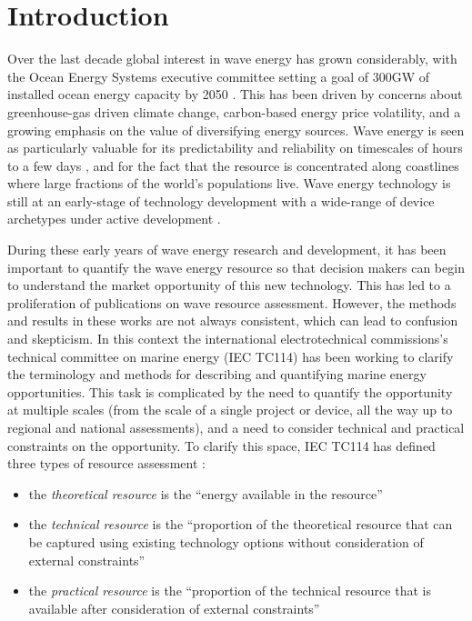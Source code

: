 \section{Introduction}

Over the last decade global interest in wave energy has grown considerably, with
the Ocean Energy Systems executive committee setting a goal of 300GW of
installed ocean energy capacity by 2050
\citep[]{huckerbyInternationalVisionOcean2017}. This has been driven by concerns
about greenhouse-gas driven climate change, carbon-based energy price
volatility, and a growing emphasis on the value of diversifying energy
sources. Wave energy is seen as particularly valuable for its predictability and
reliability on timescales of hours to a few days
\citep{parkinsonIntegratingOceanWave2015}, and for the fact that the resource is
concentrated along coastlines where large fractions of the world's populations
live. Wave energy technology is still at an early-stage of technology
development with a wide-range of device archetypes under active development
\citep[]{babaritOceanWaveEnergy2017}.

During these early years of wave energy research and development, it has been
important to quantify the wave energy resource so that decision makers can begin to understand the market opportunity of this new technology. This has led to a
proliferation of publications on wave resource assessment. However, the
methods and results in these works are not always consistent, which can lead to confusion and skepticism. In this context the international electrotechnical commissions's technical committee on marine energy (IEC TC114) has been working to clarify the terminology and methods for describing and quantifying marine energy opportunities. This task is complicated by the need to quantify the opportunity at multiple scales (from the scale of a single project or device, all the way up to regional and national assessments), and a need to consider technical and practical constraints on the opportunity. To clarify this space, IEC TC114 has defined three types of resource assessment
\citep{internationalelectrotechnicalcommissionPartTerminology2011} :

\begin{itemize}
  \item the { \it theoretical resource} is the ``energy available in the resource''
  \item the {\it technical resource} is the ``proportion of the theoretical resource that can be captured using existing technology options without consideration of external constraints''
  \item the {\it practical resource} is the ``proportion of the technical resource that is available after consideration of external constraints''
\end{itemize}

